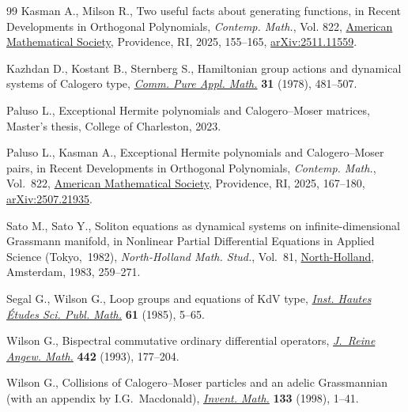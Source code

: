 \documentclass[10pt,a4paper]{amsart}
\numberwithin{equation}{section}
\theoremstyle{definition}
\begin{document}
\begin{thebibliography}{99}
Kasman A., Milson R., Two useful facts about generating functions, in Recent
 {D}evelopments in {O}rthogonal {P}olynomials, \textit{Contemp. Math.}, Vol.
 822, \href{https://doi.org/10.1090/conm/822/16476}{American Mathematical
 Society}, Providence, RI, 2025, 155--165,
 \href{http://arxiv.org/abs/2511.11559}{arXiv:2511.11559}.

Kazhdan D., Kostant B., Sternberg S., Hamiltonian group actions and dynamical
 systems of {C}alogero type,
 \href{https://doi.org/10.1002/cpa.3160310405}{\textit{Comm. Pure Appl.
 Math.}} \textbf{31} (1978), 481--507.

Paluso L., Exceptional {H}ermite polynomials and {C}alogero--{M}oser matrices,
 {M}aster's thesis, {C}ollege of Charleston, 2023.

Paluso L., Kasman A., Exceptional {H}ermite polynomials and {C}alogero--{M}oser
 pairs, in Recent {D}evelopments in {O}rthogonal {P}olynomials,
 \textit{Contemp. Math.}, Vol.~822,
 \href{https://doi.org/10.1090/conm/822/16481}{American Mathematical Society},
 Providence, RI, 2025, 167--180,
 \href{http://arxiv.org/abs/2507.21935}{arXiv:2507.21935}.

Sato M., Sato Y., Soliton equations as dynamical systems on
 infinite-dimensional {G}rassmann manifold, in Nonlinear {P}artial
 {D}ifferential {E}quations in {A}pplied {S}cience ({T}okyo,~1982),
 \textit{North-Holland Math. Stud.}, Vol.~81,
 \href{https://doi.org/10.1016/S0304-0208(08)72096-6}{North-Holland},
 Amsterdam, 1983, 259--271.

Segal G., Wilson G., Loop groups and equations of {K}d{V} type,
 \href{https://doi.org/10.1007/BF02698802}{\textit{Inst. Hautes \'{E}tudes
 Sci. Publ. Math.}} \textbf{61} (1985), 5--65.

Wilson G., Bispectral commutative ordinary differential operators,
 \href{https://doi.org/10.1515/crll.1993.442.177}{\textit{J.~Reine Angew.
 Math.}} \textbf{442} (1993), 177--204.

Wilson G., Collisions of {C}alogero--{M}oser particles and an adelic
 {G}rassmannian (with an appendix by I.G.~Macdonald),
 \href{https://doi.org/10.1007/s002220050237}{\textit{Invent. Math.}}
 \textbf{133} (1998), 1--41.

\end{thebibliography}
\end{document}
